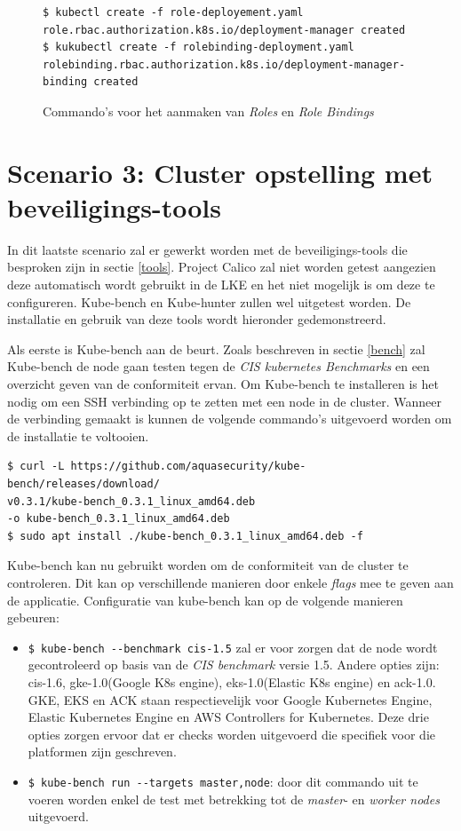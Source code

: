 \begin{figure}[h] 
	\centering
\begin{verbatim} 
$ kubectl create -f role-deployement.yaml
role.rbac.authorization.k8s.io/deployment-manager created
$ kukubectl create -f rolebinding-deployment.yaml
rolebinding.rbac.authorization.k8s.io/deployment-manager-binding created
\end{verbatim}
	\caption{Commando's voor het aanmaken van \textit{Roles} en \textit{Role Bindings}}
	\label{createRoles}
\end{figure}

\clearpage
\section{Scenario 3: Cluster opstelling met beveiligings-tools}
In dit laatste scenario zal er gewerkt worden met de beveiligings-tools die besproken zijn in sectie \ref{tools}. Project Calico zal niet worden getest aangezien deze automatisch wordt gebruikt in de LKE en het niet mogelijk is om deze te configureren. Kube-bench en Kube-hunter zullen wel uitgetest worden. De installatie en gebruik van deze tools wordt hieronder gedemonstreerd.

Als eerste is Kube-bench aan de beurt. Zoals beschreven in sectie \ref{bench} zal Kube-bench de node gaan testen tegen de \textit{CIS kubernetes Benchmarks} en een overzicht geven van de conformiteit ervan. Om Kube-bench te installeren is het nodig om een SSH verbinding op te zetten met een node in de cluster. Wanneer de verbinding gemaakt is kunnen de volgende commando's uitgevoerd worden om de installatie te voltooien.

\begin{verbatim} 
$ curl -L https://github.com/aquasecurity/kube-bench/releases/download/
v0.3.1/kube-bench_0.3.1_linux_amd64.deb
-o kube-bench_0.3.1_linux_amd64.deb
$ sudo apt install ./kube-bench_0.3.1_linux_amd64.deb -f
\end{verbatim}

Kube-bench kan nu gebruikt worden om de conformiteit van de cluster te controleren. Dit kan op verschillende manieren door enkele \textit{flags} mee te geven aan de applicatie. Configuratie van kube-bench kan op de volgende manieren gebeuren:
\begin{itemize}
	\item \verb|$ kube-bench --benchmark cis-1.5| zal er voor zorgen dat de node wordt gecontroleerd op basis van de \textit{CIS benchmark} versie 1.5. Andere opties zijn: cis-1.6, gke-1.0(Google K8s engine), eks-1.0(Elastic K8s engine) en ack-1.0. GKE, EKS en ACK staan respectievelijk voor Google Kubernetes Engine, Elastic Kubernetes Engine en AWS Controllers for Kubernetes. Deze drie opties zorgen ervoor dat er checks worden uitgevoerd die specifiek voor die platformen zijn geschreven.
	\item \verb|$ kube-bench run --targets master,node|: door dit commando uit te voeren worden enkel de test met betrekking tot de \textit{master}- en \textit{worker nodes} uitgevoerd.
\end{itemize}

